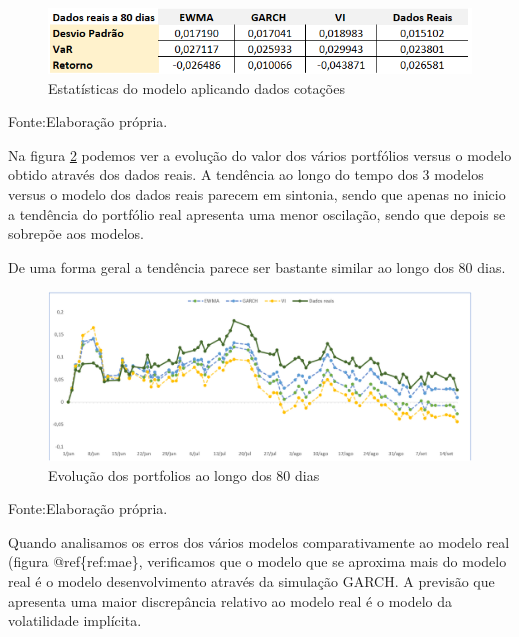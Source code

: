\documentclass[
  12pt,
  a4paper,
  openany]{book}
\theoremstyle{definition}
\theoremstyle{definition}
\theoremstyle{definition}
\theoremstyle{remark}
\begin{document}
\begin{figure}

{\centering \includegraphics[width=0.8\linewidth]{image/dadosreais80dias} 

}

\caption{Estatísticas do modelo aplicando dados cotações}\label{fig:dias}
\end{figure}
\FloatBarrier
\centering

Fonte:Elaboração própria.

\justifying
\bigskip

Na figura \ref{fig:grafico} podemos ver a evolução do valor dos vários portfólios versus o modelo obtido através dos dados reais. A tendência ao longo do tempo dos 3 modelos versus o modelo dos dados reais parecem em sintonia, sendo que apenas no inicio a tendência do portfólio real apresenta uma menor oscilação, sendo que depois se sobrepõe aos modelos.

De uma forma geral a tendência parece ser bastante similar ao longo dos 80 dias.

\begin{figure}

{\centering \includegraphics[width=1\linewidth]{image/graficofinal} 

}

\caption{Evolução dos portfolios ao longo dos 80 dias}\label{fig:grafico}
\end{figure}
\FloatBarrier
\centering

Fonte:Elaboração própria.

\justifying
\bigskip

Quando analisamos os erros dos vários modelos comparativamente ao modelo real (figura @ref\{ref:mae\}, verificamos que o modelo que se aproxima mais do modelo real é o modelo desenvolvimento através da simulação GARCH. A previsão que apresenta uma maior discrepância relativo ao modelo real é o modelo da volatilidade implícita.
\end{document}
